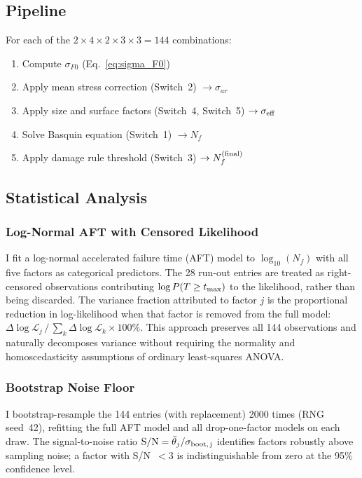 \documentclass[12pt,a4paper]{article}
\begin{document}
\subsection{Pipeline}

For each of the $2\times4\times2\times3\times3 = 144$ combinations:
\begin{enumerate}
  \item Compute $\sigma_{F0}$ (Eq.~\ref{eq:sigma_F0})
  \item Apply mean stress correction (Switch~2) $\rightarrow \sigma_{ar}$
  \item Apply size and surface factors (Switch~4, Switch~5)
        $\rightarrow \sigma_{\rm eff}$
  \item Solve Basquin equation (Switch~1) $\rightarrow N_f$
  \item Apply damage rule threshold (Switch~3)
        $\rightarrow N_f^{\rm (final)}$
\end{enumerate}

\subsection{Statistical Analysis}

\subsubsection{Log-Normal AFT with Censored Likelihood}

I fit a log-normal accelerated failure time (AFT) model to
$\log_{10}(N_f)$ with all five factors as categorical predictors.
The 28 run-out entries are treated as right-censored observations
contributing $\log P(T \geq t_{\rm max})$ to the likelihood, rather
than being discarded. The variance fraction attributed to factor
$j$ is the proportional reduction in log-likelihood when that factor
is removed from the full model: $\Delta\log\mathcal{L}_j\,/\,
\sum_k \Delta\log\mathcal{L}_k \times 100\%$. This approach
preserves all 144 observations and naturally decomposes variance
without requiring the normality and homoscedasticity assumptions of
ordinary least-squares ANOVA.

\subsubsection{Bootstrap Noise Floor}

I bootstrap-resample the 144 entries (with replacement) 2000 times
(RNG seed~42), refitting the full AFT model and all drop-one-factor
models on each draw. The signal-to-noise ratio
$\mathrm{S/N} = \bar{\theta}_j / \sigma_{\rm boot,\,j}$ identifies
factors robustly above sampling noise;
a factor with S/N~$<3$ is indistinguishable from zero at the 95\%
confidence level.
\end{document}
